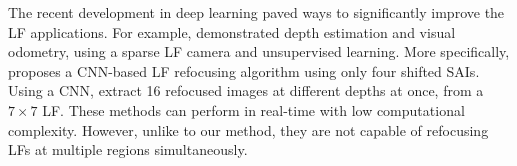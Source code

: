 The recent development in deep learning paved ways to significantly improve the LF applications. For example, \cite{2021unsupervised} demonstrated depth estimation and visual odometry, using a sparse LF camera and unsupervised learning. More specifically, \cite{deep_sparse} proposes a CNN-based LF refocusing algorithm using only four shifted SAIs. Using a CNN, \cite{machinelearning_multi_refocus} extract 16 refocused images at different depths at once, from a $7 \times 7$ LF. These methods can perform in real-time with low computational complexity. However, unlike to our method, they are not capable of refocusing LFs at multiple regions simultaneously.


